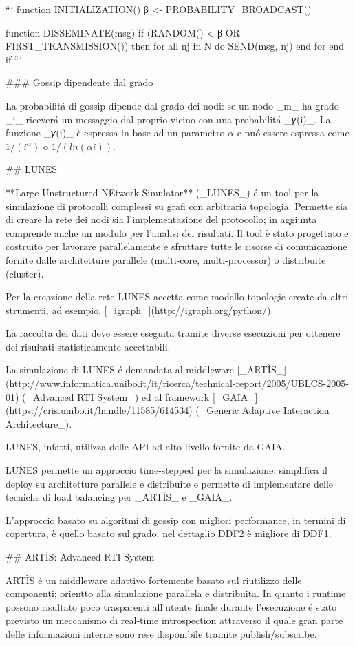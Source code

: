 ```
function INITIALIZATION()
    β <- PROBABILITY\_BROADCAST()

function DISSEMINATE(msg)
    if (RANDOM() < β OR FIRST\_TRANSMISSION()) then
        for all nj in N do
            SEND(msg, nj)
        end for
    end if
```

### Gossip dipendente dal grado

La probabilitá di gossip dipende dal grado dei nodi: se un nodo \_m\_ ha grado \_i\_ riceverá un messaggio dal proprio vicino con una probabilitá \_𝛾(i)\_. La funzione \_𝛾(i)\_ è espressa in base ad un parametro $α$ e puó essere espressa come $1/(i ^ α)$ o $1/(ln(αi))$.

## LUNES

**Large Unstructured NEtwork Simulator** (\_LUNES\_) é un tool per la simulazione di protocolli complessi su grafi con arbitraria topologia. Permette sia di creare la rete dei nodi sia l'implementazione del protocollo; in aggiunta comprende anche un modulo per l'analisi dei risultati.
Il tool è stato progettato e costruito per lavorare parallelamente e sfruttare tutte le risorse di comunicazione fornite dalle architetture parallele (multi-core, multi-processor) o distribuite (cluster).

Per la creazione della rete LUNES accetta come modello topologie create da altri strumenti, ad esempio, [\_igraph\_](http://igraph.org/python/).

La raccolta dei dati deve essere eseguita tramite diverse esecuzioni per ottenere dei risultati statisticamente accettabili.

La simulazione di LUNES é demandata al middleware [\_ARTÌS\_](http://www.informatica.unibo.it/it/ricerca/technical-report/2005/UBLCS-2005-01) (\_Advanced RTI System\_) ed al framework [\_GAIA\_](https://cris.unibo.it/handle/11585/614534) (\_Generic Adaptive Interaction Architecture\_).

LUNES, infatti, utilizza delle API ad alto livello fornite da GAIA.

LUNES permette un approccio time-stepped per la simulazione: simplifica il deploy su architetture parallele e distribuite e permette di implementare delle tecniche di load balancing per \_ARTÌS\_ e \_GAIA\_.

L'approccio basato su algoritmi di gossip con migliori performance, in termini di copertura, è quello basato sul grado; nel dettaglio DDF2 è migliore di DDF1.

## ARTÌS: Advanced RTI System

ARTÌS é un middleware adattivo fortemente basato sul riutilizzo delle componenti; orientto alla simulazione parallela e distribuita. In quanto i runtime possono risultato poco trasparenti all'utente finale durante l'esecuzione é stato previsto un meccanismo di real-time introspection attraverso il quale gran parte delle informazioni interne sono rese disponibile tramite publish/subscribe.

